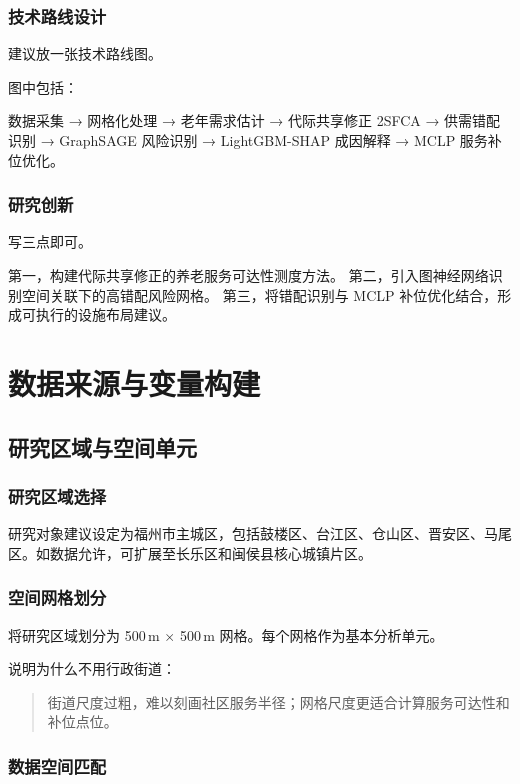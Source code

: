 \documentclass[UTF8,zihao=-4,a4paper,fontset=none]{ctexart}
\begin{document}
\subsubsection{技术路线设计}

建议放一张技术路线图。

图中包括：

数据采集 → 网格化处理 → 老年需求估计 → 代际共享修正 2SFCA → 供需错配识别 → GraphSAGE 风险识别 → LightGBM-SHAP 成因解释 → MCLP 服务补位优化。

\subsubsection{研究创新}

写三点即可。

第一，构建代际共享修正的养老服务可达性测度方法。
第二，引入图神经网络识别空间关联下的高错配风险网格。
第三，将错配识别与 MCLP 补位优化结合，形成可执行的设施布局建议。

\section{数据来源与变量构建}

\subsection{研究区域与空间单元}

\subsubsection{研究区域选择}

研究对象建议设定为福州市主城区，包括鼓楼区、台江区、仓山区、晋安区、马尾区。如数据允许，可扩展至长乐区和闽侯县核心城镇片区。

\subsubsection{空间网格划分}

将研究区域划分为 500\,m $\times$ 500\,m 网格。每个网格作为基本分析单元。

说明为什么不用行政街道：

\begin{quote}
街道尺度过粗，难以刻画社区服务半径；网格尺度更适合计算服务可达性和补位点位。
\end{quote}

\subsubsection{数据空间匹配}
\end{document}
